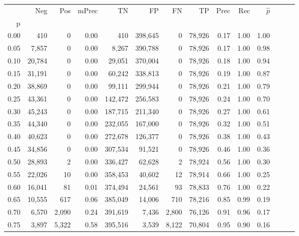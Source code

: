 \begin{tabular}{rrrrrrrrrrrrrr}
\toprule
{} &     Neg &     Pos & mPrec &       TN &       FP &      FN &      TP &  Prec &   Rec & $\hat{p}$ \\
p    &         &         &       &          &          &         &         &       &       &           \\
\midrule
0.00 &     410 &       0 &  0.00 &      410 &  398,645 &       0 &  78,926 &  0.17 &  1.00 &      1.00 \\
0.05 &   7,857 &       0 &  0.00 &    8,267 &  390,788 &       0 &  78,926 &  0.17 &  1.00 &      0.98 \\
0.10 &  20,784 &       0 &  0.00 &   29,051 &  370,004 &       0 &  78,926 &  0.18 &  1.00 &      0.94 \\
0.15 &  31,191 &       0 &  0.00 &   60,242 &  338,813 &       0 &  78,926 &  0.19 &  1.00 &      0.87 \\
0.20 &  38,869 &       0 &  0.00 &   99,111 &  299,944 &       0 &  78,926 &  0.21 &  1.00 &      0.79 \\
0.25 &  43,361 &       0 &  0.00 &  142,472 &  256,583 &       0 &  78,926 &  0.24 &  1.00 &      0.70 \\
0.30 &  45,243 &       0 &  0.00 &  187,715 &  211,340 &       0 &  78,926 &  0.27 &  1.00 &      0.61 \\
0.35 &  44,340 &       0 &  0.00 &  232,055 &  167,000 &       0 &  78,926 &  0.32 &  1.00 &      0.51 \\
0.40 &  40,623 &       0 &  0.00 &  272,678 &  126,377 &       0 &  78,926 &  0.38 &  1.00 &      0.43 \\
0.45 &  34,856 &       0 &  0.00 &  307,534 &   91,521 &       0 &  78,926 &  0.46 &  1.00 &      0.36 \\
0.50 &  28,893 &       2 &  0.00 &  336,427 &   62,628 &       2 &  78,924 &  0.56 &  1.00 &      0.30 \\
0.55 &  22,026 &      10 &  0.00 &  358,453 &   40,602 &      12 &  78,914 &  0.66 &  1.00 &      0.25 \\
0.60 &  16,041 &      81 &  0.01 &  374,494 &   24,561 &      93 &  78,833 &  0.76 &  1.00 &      0.22 \\
0.65 &  10,555 &     617 &  0.06 &  385,049 &   14,006 &     710 &  78,216 &  0.85 &  0.99 &      0.19 \\
0.70 &   6,570 &   2,090 &  0.24 &  391,619 &    7,436 &   2,800 &  76,126 &  0.91 &  0.96 &      0.17 \\
0.75 &   3,897 &   5,322 &  0.58 &  395,516 &    3,539 &   8,122 &  70,804 &  0.95 &  0.90 &      0.16 \\

\end{tabular}
